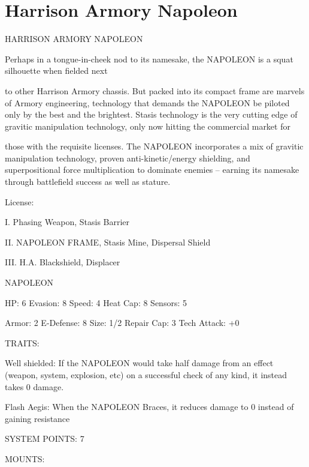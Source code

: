 \section{Harrison Armory Napoleon}


                             HARRISON ARMORY NAPOLEON

Perhaps in a tongue-in-cheek nod to its namesake, the NAPOLEON is a squat silhouette when fielded next

to other Harrison Armory chassis. But packed into its compact frame are marvels of Armory engineering,
technology that demands the NAPOLEON be piloted only by the best and the brightest. Stasis technology
is the very cutting edge of gravitic manipulation technology, only now hitting the commercial market for

those with the requisite licenses. The NAPOLEON incorporates a mix of gravitic manipulation technology,
proven anti-kinetic/energy shielding, and superpositional force multiplication to dominate enemies --
earning its namesake through battlefield success as well as stature.

                                                  License:

I. Phasing Weapon, Stasis Barrier

II. NAPOLEON FRAME, Stasis Mine, Dispersal Shield

III. H.A. Blackshield, Displacer


                                               NAPOLEON

 HP: 6          Evasion: 8                           Speed: 4           Heat Cap: 8       Sensors:  5

 Armor: 2       E-Defense: 8                         Size: 1/2          Repair Cap: 3     Tech Attack:
                                                                                          +0

                                                  TRAITS:

 Well shielded: If the NAPOLEON would take half damage from an effect (weapon, system, explosion,
 etc) on a successful check of any kind, it instead takes 0 damage.

 Flash Aegis: When the NAPOLEON Braces, it reduces damage to 0 instead of gaining resistance

                                            SYSTEM POINTS: 7

                                                 MOUNTS:

